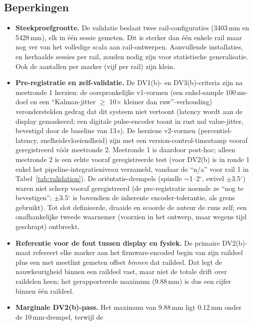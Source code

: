 \documentclass[10pt, a4paper, twocolumn]{article}
\begin{document}
\subsection{Beperkingen}
\begin{itemize}[leftmargin=*]
  \item \textbf{Steekproefgrootte.} De validatie beslaat twee rail-configuraties
    (3403\,mm en 5428\,mm), elk in één sessie gemeten. Dit is sterker dan één
    enkele rail maar nog ver van het volledige scala aan rail-ontwerpen.
    Aanvullende installaties, en herhaalde sessies per rail, zouden nodig zijn
    voor statistische generalisatie. Ook de aantallen per marker (vijf per rail)
    zijn klein.
  \item \textbf{Pre-registratie en zelf-validatie.} De DV1(b)- en
    DV3(b)-criteria zijn na meetronde 1 herzien: de oorspronkelijke v1-vormen (een
    enkel-sample 100\,ms-doel en een ``Kalman-jitter $\geq$ 10$\times$ kleiner dan
    ruw''-verhouding) veronderstelden gedrag dat dit systeem niet vertoont (latency
    wordt aan de display gemaskeerd; een digitale pulse-encoder toont in rust nul
    value-jitter, bevestigd door de baseline van 13\,s). De herziene v2-vormen
    (percentiel-latency, snelheidsvloeiendheid) zijn met een
    version-control-timestamp vooraf geregistreerd vóór meetronde 2. Meetronde 1
    is daardoor post-hoc; alleen meetronde 2 is een echte vooraf geregistreerde
    test (voor DV2(b) is in ronde 1 enkel het pipeline-integratieniveau verzameld,
    vandaar de ``n/a'' voor rail 1 in Tabel~\ref{tab:validation}). De
    oriëntatie-drempels (spindle $\sim$1--2$^\circ$, swivel $\pm$3.5$^\circ$) waren
    niet scherp vooraf geregistreerd (de pre-registratie noemde ze ``nog te
    bevestigen''; $\pm$3.5$^\circ$ is bovendien de inherente encoder-tolerantie,
    als grens gebruikt). Tot slot definieerde, draaide en scoorde de auteur de
    runs zelf; een onafhankelijke tweede waarnemer (voorzien in het ontwerp, maar
    wegens tijd geschrapt) ontbreekt.
  \item \textbf{Referentie voor de fout tussen display en fysiek.} De primaire
    DV2(b)-maat refereert elke marker aan het firmware-encoded begin van zijn
    raildeel plus een met meetlint gemeten offset \emph{binnen} dat raildeel. Dat
    legt de nauwkeurigheid binnen een raildeel vast, maar niet de totale drift
    over raildelen heen; het gerapporteerde maximum (9.88\,mm) is dus een cijfer
    binnen één raildeel.
  \item \textbf{Marginale DV2(b)-pass.}
    Het maximum van 9.88\,mm ligt 0.12\,mm onder de 10\,mm-drempel, terwijl de

\end{itemize}
\end{document}
